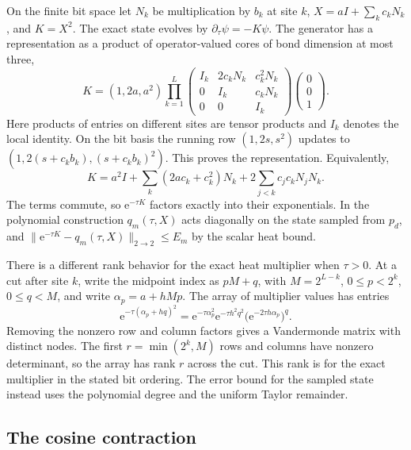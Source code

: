 \documentclass[11pt]{article}
\newcommand{\e}{\mathrm e}
\begin{document}
On the finite bit space let \(N_k\) be multiplication by \(b_k\) at
site \(k\), \(X=aI+\sum_k c_kN_k\), and \(K=X^2\).
The exact state evolves by \(\partial_\tau\psi=-K\psi\).
The generator has a representation as a product of operator-valued
cores of bond dimension at most three,
\[
 K=(1,2a,a^2)\prod_{k=1}^{L}
      \begin{pmatrix}
       I_k&2c_kN_k&c_k^2N_k\\
       0&I_k&c_kN_k\\
       0&0&I_k
      \end{pmatrix}
       \begin{pmatrix}0\\0\\1\end{pmatrix}.
\]
Here products of entries on different sites are tensor products and
\(I_k\) denotes the local identity. On the bit basis the running row
\((1,2s,s^2)\) updates to \((1,2(s+c_k b_k),(s+c_k b_k)^2)\).
This proves the representation. Equivalently,
\[
 K=a^2I+\sum_k(2ac_k+c_k^2)N_k
    +2\sum_{j<k}c_jc_kN_jN_k.
\]
The terms commute, so \(\e^{-\tau K}\) factors exactly into their
exponentials. In the polynomial construction \(q_m(\tau,X)\) acts
diagonally on the state sampled from \(p_d\), and
\(\|\e^{-\tau K}-q_m(\tau,X)\|_{2\to2}\le E_m\) by the scalar
heat bound.

There is a different rank behavior for the exact heat multiplier
when \(\tau>0\). At a cut after site \(k\), write the midpoint index as
\(pM+q\), with \(M=2^{L-k}\), \(0\le p<2^k\), \(0\le q<M\), and
write \(\alpha_p=a+hMp\). The array of multiplier values has entries
\[
 \e^{-\tau(\alpha_p+hq)^2}
 =\e^{-\tau\alpha_p^2}\e^{-\tau h^2q^2}
    \bigl(\e^{-2\tau h\alpha_p}\bigr)^q .
\]
Removing the nonzero row and column factors gives a Vandermonde
matrix with distinct nodes. The first \(r=\min(2^k,M)\) rows and
columns have nonzero determinant, so the array has rank \(r\) across
the cut. This rank is for the exact multiplier in the stated bit
ordering. The error bound for the sampled state instead uses the
polynomial degree and the uniform Taylor remainder.

\subsection{The cosine contraction}
\end{document}
